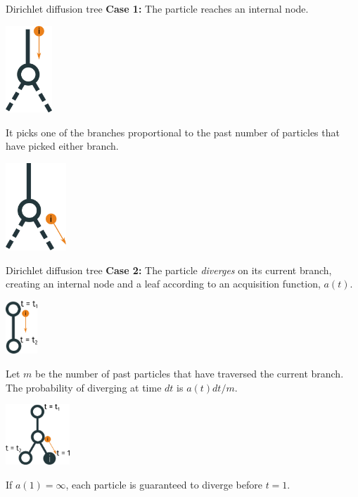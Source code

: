 \documentclass[10pt, compress]{beamer}
\begin{document}
\begin{frame}{Dirichlet diffusion tree}
  \textbf{Case 1:} 
  The particle reaches an internal node.
  \begin{center}
      \includegraphics[width=0.13\textwidth]{img/ddt-2}
  \end{center}

  \pause

  It picks one of the branches proportional to the past number
  of particles that have picked either branch.

  \pause

  \begin{center}
      \includegraphics[width=0.17\textwidth]{img/ddt-3}
  \end{center}
\end{frame}

\begin{frame}{Dirichlet diffusion tree}
  \textbf{Case 2:} 
  The particle \emph{diverges} on its current branch,
  creating an internal node and a leaf
  according to
  an \alert{acquisition function}, $a(t)$.


  \begin{center}
      \includegraphics[width=0.09\textwidth]{img/ddt-4}
  \end{center}

  \pause

  Let $m$ be the number of past particles that have traversed the current branch.
  The probability of diverging at time $dt$ is $a(t)dt/m$.

  \pause

  \begin{center}
      \includegraphics[width=0.18\textwidth]{img/ddt-5}
  \end{center}

  \pause

  If $a(1) = \infty$, each particle is guaranteed to diverge before $t = 1$.

\end{frame}
\end{document}
